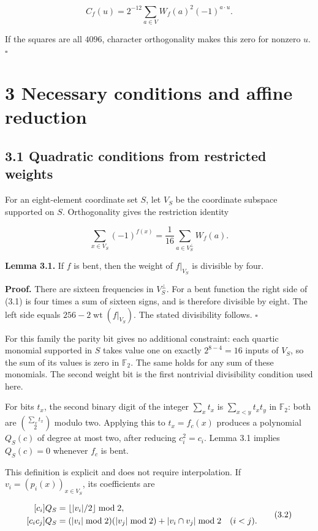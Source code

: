 \documentclass[11pt,a4paper]{article}
\begin{document}
\[
C_f(u)=2^{-12}\sum_{a\in V}W_f(a)^2(-1)^{a\cdot u}.
\]

If the squares are all $4096$, character orthogonality makes this zero for nonzero $u$. \hfill$\square$

\section*{3 Necessary conditions and affine reduction}

\subsection*{3.1 Quadratic conditions from restricted weights}

For an eight-element coordinate set $S$, let $V_S$ be the coordinate subspace supported on $S$. Orthogonality gives the restriction identity

\[
\sum_{x\in V_S}(-1)^{f(x)}=\frac1{16}\sum_{a\in V_S^\perp}W_f(a). \tag{3.1}
\]

\textbf{Lemma 3.1.} If $f$ is bent, then the weight of $f|_{V_S}$ is divisible by four.

\textbf{Proof.} There are sixteen frequencies in $V_S^\perp$. For a bent function the right side of (3.1) is four times a sum of sixteen signs, and is therefore divisible by eight. The left side equals $256-2\operatorname{wt}(f|_{V_S})$. The stated divisibility follows. \hfill$\square$

For this family the parity bit gives no additional constraint: each quartic monomial supported in $S$ takes value one on exactly $2^{8-4}=16$ inputs of $V_S$, so the sum of its values is zero in $\mathbb F_2$. The same holds for any sum of these monomials. The second weight bit is the first nontrivial divisibility condition used here.

For bits $t_x$, the second binary digit of the integer $\sum_x t_x$ is
$\sum_{x<y}t_xt_y$ in $\mathbb F_2$: both are $\binom{\sum_x t_x}{2}$ modulo two. Applying this to $t_x=f_c(x)$ produces a polynomial $Q_S(c)$ of degree at most two, after reducing $c_i^2=c_i$. Lemma 3.1 implies $Q_S(c)=0$ whenever $f_c$ is bent.

This definition is explicit and does not require interpolation. If $v_i=(p_i(x))_{x\in V_S}$, its coefficients are

\[
\begin{aligned}\relax[c_i]Q_S&=\left\lfloor |v_i|/2\right\rfloor\bmod2,\\\relax[c_ic_j]Q_S&=(|v_i|\bmod2)(|v_j|\bmod2)+|v_i\cap v_j|\bmod2\quad(i<j).\end{aligned} \tag{3.2}
\]
\end{document}
